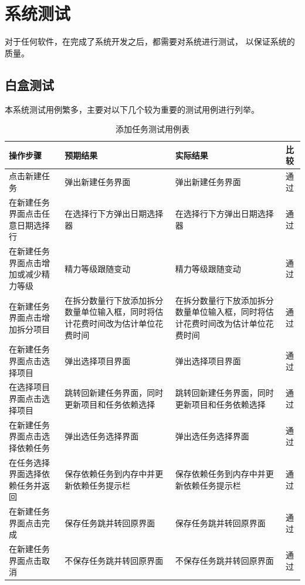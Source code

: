
\chapter{系统测试}

对于任何软件，在完成了系统开发之后，都需要对系统进行测试，
以保证系统的质量。

\section{白盒测试}
本系统测试用例繁多，主要对以下几个较为重要的测试用例进行列举。
\begin{table}[H]
	\centering
	\caption{添加任务测试用例表}
	\begin{tabular}{p{3cm}p{3cm}p{3cm}p{3cm}} \toprule
	  操作步骤 & 预期结果 & 实际结果 & 比较 \\
	  \midrule
	  点击新建任务 & 弹出新建任务界面 & 弹出新建任务界面 & 通过 \\ \midrule
	  在新建任务界面点击任意日期选择行 & 在选择行下方弹出日期选择器 & 在选择行下方弹出日期选择器 & 通过 \\ \midrule
	  在新建任务界面点击增加或减少精力等级 & 精力等级跟随变动 & 精力等级跟随变动 & 通过 \\ \midrule
	  在新建任务界面点击增加拆分项目 & 在拆分数量行下放添加拆分数量单位输入框，同时将估计花费时间改为估计单位花费时间 & 在拆分数量行下放添加拆分数量单位输入框，同时将估计花费时间改为估计单位花费时间 & 通过 \\ \midrule
	  在新建任务界面点击选择项目 & 弹出选择项目界面 & 弹出选择项目界面 & 通过 \\ \midrule
	  在选择项目界面点击选择项目 & 跳转回新建任务界面，同时更新项目和任务依赖选择 & 跳转回新建任务界面，同时更新项目和任务依赖选择 & 通过 \\ \midrule
	  在新建任务界面点击选择依赖任务 & 弹出选任务选择界面 & 弹出选任务选择界面 & 通过 \\ \midrule
	  在任务选择界面选择依赖任务并返回 & 保存依赖任务到内存中并更新依赖任务提示栏 & 保存依赖任务到内存中并更新依赖任务提示栏 & 通过 \\ \midrule
	  在新建任务界面点击完成 & 保存任务跳并转回原界面 & 保存任务跳并转回原界面 & 通过 \\ \midrule
	  在新建任务界面点击取消 & 不保存任务跳并转回原界面 & 不保存任务跳并转回原界面 & 通过 \\ \midrule
	  \bottomrule
	\end{tabular}
\end{table}


